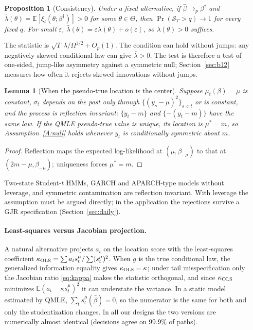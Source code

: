 \documentclass[11pt,a4paper]{article}
\newtheorem{lemma}{Lemma}
\newtheorem{proposition}{Proposition}
\theoremstyle{definition}
\theoremstyle{remark}
\newcommand{\E}{\mathbb{E}}
\begin{document}
\begin{proposition}[Consistency]\label{prop:cons}
Under a fixed alternative, if $\hat\beta\to_p\beta^\dagger$ and $\bar\lambda(\theta)=\E[\xi_t(\theta;\beta^\dagger)]>0$ for some $\theta\in\Theta$, then $\Pr(\mathcal S_T>q)\to1$ for every fixed $q$. For small $\varepsilon$, $\bar\lambda(\theta)=\varepsilon\lambda(\theta)+o(\varepsilon)$, so $\lambda(\theta)>0$ suffices.
\end{proposition}
\noindent The statistic is $\sqrt T\,\bar\lambda/\Omega^{1/2}+O_p(1)$. The condition can hold without jumps: any negatively skewed conditional law can give $\bar\lambda>0$. The test is therefore a test of one-sided, jump-like asymmetry against a symmetric null; Section~\ref{sec:b12} measures how often it rejects skewed innovations without jumps.

\begin{lemma}[When the pseudo-true location is the center]\label{lem:pseudo}
Suppose $\mu_t(\beta)=\mu$ is constant, $\sigma_t$ depends on the past only through $\{(y_s-\mu)^2\}_{s<t}$ or is constant, and the process is reflection invariant: $\{y_t-m\}$ and $\{-(y_t-m)\}$ have the same law. If the QMLE pseudo-true value is unique, its location is $\mu^*=m$, so Assumption~\ref{A:null} holds whenever $y_t$ is conditionally symmetric about $m$.
\end{lemma}
\begin{proof}
Reflection maps the expected log-likelihood at $(\mu,\beta_{-\mu})$ to that at $(2m-\mu,\beta_{-\mu})$; uniqueness forces $\mu^*=m$.
\end{proof}
\noindent Two-state Student-$t$ HMMs, GARCH and APARCH-type models without leverage, and symmetric contamination are reflection invariant. With leverage the assumption must be argued directly; in the application the rejections survive a GJR specification (Section~\ref{sec:daily}).

\paragraph{Least-squares versus Jacobian projection.} A natural alternative projects $a_t$ on the location score with the least-squares coefficient $\kappa_{\rm OLS}=\sum a_ts^\mu_t/\sum(s^\mu_t)^2$. When $g$ is the true conditional law, the generalized information equality gives $\kappa_{\rm OLS}=\kappa$; under tail misspecification only the Jacobian ratio \eqref{eq:kappa} makes the statistic orthogonal, and since $\kappa_{\rm OLS}$ minimizes $\E(a_t-\kappa s^\mu_t)^2$ it can understate the variance. In a static model estimated by QMLE, $\sum_ts^\mu_t(\hat\beta)=0$, so the numerator is the same for both and only the studentization changes. In all our designs the two versions are numerically almost identical (decisions agree on 99.9\% of paths).
\end{document}
